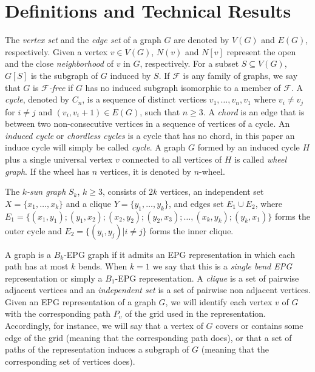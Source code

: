 \documentclass[9pt]{entcs}
\begin{document}
\section{Definitions and Technical Results}

The \textit{vertex set} and the \textit{edge set} of a graph $G$ are denoted by $V(G)$ and $E(G)$, respectively.  Given a vertex $v\in V(G)$,  $N(v)$ and $N[v]$ represent the open and the close
 \textit{neighborhood} of $v$ in $G$, respectively. 
For a subset $S \subseteq V(G)$,  $G[S]$ is the subgraph of $G$ induced by $S$.
 If $\mathcal{F}$ is any family of graphs, we say that  $G$ is  \textit{$\mathcal{F}$-free} if $G$ has no induced subgraph isomorphic to a member of $\mathcal{F}$.
 A \textit{cycle},  denoted by $C_n$,  is a sequence of distinct
vertices $v_1, \dots , v_n, v_1$  where $v_i \neq v_j$ for $i \neq j$ and $(v_i, v_i + 1) \in E(G)$, such that
$n \geq 3$. A \textit{chord} is an edge that is between two non-consecutive vertices in a sequence of vertices of a cycle. An \textit{induced cycle}  or \textit{chordless cycles} is a cycle that has no chord, in this paper an induce cycle will simply be called  \textit{cycle}. A graph $G$ formed by an induced cycle $H$ plus  a single universal vertex $v$ connected to all vertices of $H$
is called \textit{wheel graph}. If the wheel has $n$ vertices, it is denoted by $n$-wheel. 

The $k$\textit{-sun graph }$S_k$, $k \geq 3$, consists of
$2k$ vertices, an independent set $X = \{x_1, \dots, x_k\}$ and a clique $Y = \{y_1, \dots, y_k\}$, and edges set $E_1 \cup E_2$, where $E_ 1=\{ (x_1,y_1); (y_1, x_2); (x_2, y_2); (y_2, x_3); \dots , (x_k, y_k); (y_k, x_1) \}$ forms the outer cycle and $E_2= \{(y_i, y_j) |i\neq j\}$ forms the inner clique.

A graph is a $ B_k$-EPG graph if it admits an EPG representation in which each path has at most $k$ bends.  When $ k = 1 $ we say that this is a \emph{single bend EPG} representation or simply a $B_1$-EPG representation.
A \textit{clique} is a set of pairwise adjacent vertices and
an \textit{independent set} is a set of pairwise non adjacent vertices.
Given an EPG representation of a graph $G$, we will identify each vertex $v$ of $G$ with the corresponding path $P_{v}$ of the grid used in the representation. Accordingly, for instance, we will say that a vertex of $G$ covers or contains some edge of the grid (meaning that the corresponding path does), or that a set of paths of the representation
induces a subgraph of $G$ (meaning that the corresponding set of vertices does). 
\end{document}
